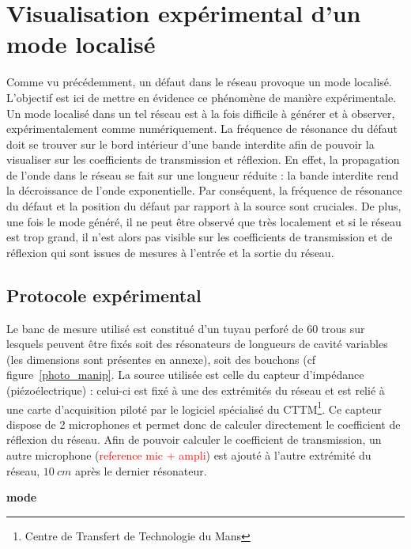 \chapter{Visualisation expérimental d'un mode localisé}
Comme vu précédemment, un défaut dans le réseau provoque un mode localisé. L'objectif est ici de mettre en évidence ce phénomène de manière expérimentale.\\


Un mode localisé dans un tel réseau est à la fois difficile à générer et à observer, expérimentalement comme numériquement. La fréquence de résonance du défaut doit se trouver sur le bord intérieur d'une bande interdite afin de pouvoir la visualiser sur les coefficients de transmission et réflexion. En effet, la propagation de l'onde dans le réseau se fait sur une longueur réduite : la bande interdite rend la décroissance de l'onde exponentielle. Par conséquent, la fréquence de résonance du défaut et la position du défaut par rapport à la source sont cruciales. De plus, une fois le mode généré, il ne peut être observé que très localement et si le réseau est trop grand, il n'est alors pas visible sur les coefficients de transmission et de réflexion qui sont issues de mesures à l'entrée et la sortie du réseau.


\section{Protocole expérimental}
Le banc de mesure utilisé est constitué d'un tuyau perforé de 60 trous sur lesquels peuvent être fixés soit des résonateurs de longueurs de cavité variables (les dimensions sont présentes en annexe), soit des bouchons (cf figure~\ref{photo_manip}. La source utilisée est celle du capteur d'impédance (piézoélectrique) : celui-ci est fixé à une des extrémités du réseau et est relié à une carte d'acquisition piloté par le logiciel spécialisé du CTTM\footnote{Centre de Transfert de Technologie du Mans}. Ce capteur dispose de 2 microphones et permet donc de calculer directement le coefficient de réflexion du réseau. Afin de pouvoir calculer le coefficient de transmission, un autre microphone (\textcolor{red}{reference mic + ampli}) est ajouté à l'autre extrémité du réseau, $10~cm$ après le dernier résonateur.


\textbf{mode }


